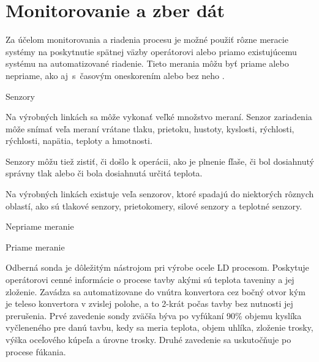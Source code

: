 \documentclass[]{tukediphc}
\begin{document}
\section{Monitorovanie a zber dát}

Za účelom monitorovania a riadenia procesu je možné použiť rôzne meracie systémy na poskytnutie spätnej väzby operátorovi alebo priamo existujúcemu systému na automatizované riadenie. Tieto merania môžu byť priame alebo nepriame, ako aj~s~časovým oneskorením alebo bez neho \cite{Widlund1998}.

Senzory

Na výrobných linkách sa môže vykonať veľké množstvo meraní. Senzor zariadenia môže snímať veľa meraní vrátane tlaku, prietoku, hustoty, kyslosti, rýchlosti, rýchlosti, napätia, teploty a hmotnosti.

Senzory môžu tiež zistiť, či došlo k operácii, ako je plnenie fľaše, či bol dosiahnutý správny tlak alebo či bola dosiahnutá určitá teplota.

Na výrobných linkách existuje veľa senzorov, ktoré spadajú do niektorých rôznych oblastí, ako sú tlakové senzory, prietokomery, silové senzory a teplotné senzory.

Nepriame meranie

Priame meranie

Odberná sonda je dôležitým nástrojom pri výrobe ocele LD procesom. Poskytuje operátorovi cenné informácie o procese tavby akými sú teplota taveniny a jej zloženie. Zavádza sa automatizovane do vnútra konvertora cez bočný otvor kým je teleso konvertora v zvislej polohe, a to 2-krát počas tavby bez nutnosti jej prerušenia. Prvé zavedenie sondy zväčša býva po vyfúkaní 90\% objemu kyslíka vyčleneného pre danú tavbu, kedy sa meria teplota, objem uhlíka, zloženie trosky, výška oceľového kúpeľa a úrovne trosky. Druhé zavedenie sa uskutočňuje po procese fúkania.
\end{document}
